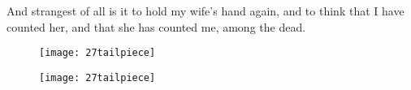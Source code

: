And strangest of all is it to hold my wife's hand again, and to think that I have counted her, and that she has counted me, among the dead.

\makeatletter
{}
{%
	\begin{figure}[bh!]
		\centering
		\texttt{[image: 27tailpiece]}
	\end{figure}
	\enlargethispage{2\baselineskip}
}{%
	\begin{figure}[bh!]
		\centering
		\texttt{[image: 27tailpiece]}
	\end{figure}
	\enlargethispage{2\baselineskip}
}
\makeatother

